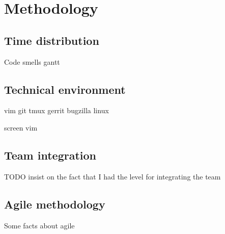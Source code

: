 %
%
\section{Methodology}

\subsection{Time distribution}
\begin{FrameWithSubSection}
    \begin{block}{Code smells}
        gantt
    \end{block}
\end{FrameWithSubSection}

\subsection{Technical environment}
\begin{FrameWithSubSection}
    \begin{block}
        vim git tmux gerrit bugzilla linux
    \end{block}
\end{FrameWithSubSection}
\begin{FrameWithSubSection}
    \begin{block}
        screen vim
    \end{block}
\end{FrameWithSubSection}

\subsection{Team integration}
\begin{FrameWithSubSection}
    TODO insist on the fact that I had the level for integrating the team
\end{FrameWithSubSection}

\subsection{Agile methodology}
\begin{FrameWithSubSection}
    Some facts about agile
\end{FrameWithSubSection}


